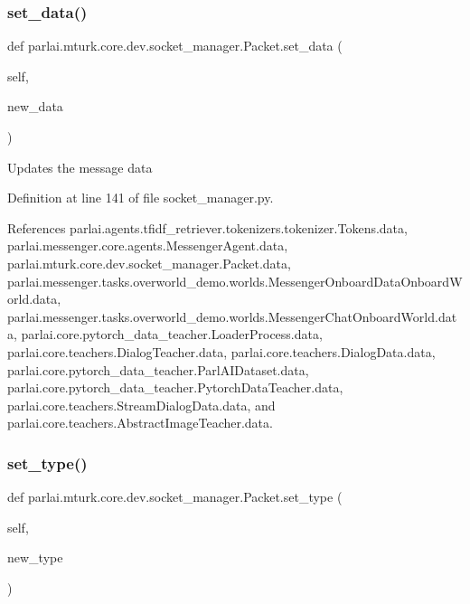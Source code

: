 \subsubsection{\texorpdfstring{set\+\_\+data()}{set\_data()}}
{\footnotesize\ttfamily def parlai.\+mturk.\+core.\+dev.\+socket\+\_\+manager.\+Packet.\+set\+\_\+data (\begin{DoxyParamCaption}\item[{}]{self,  }\item[{}]{new\+\_\+data }\end{DoxyParamCaption})}

\begin{DoxyVerb}Updates the message data\end{DoxyVerb}
 

Definition at line 141 of file socket\+\_\+manager.\+py.



References parlai.\+agents.\+tfidf\+\_\+retriever.\+tokenizers.\+tokenizer.\+Tokens.\+data, parlai.\+messenger.\+core.\+agents.\+Messenger\+Agent.\+data, parlai.\+mturk.\+core.\+dev.\+socket\+\_\+manager.\+Packet.\+data, parlai.\+messenger.\+tasks.\+overworld\+\_\+demo.\+worlds.\+Messenger\+Onboard\+Data\+Onboard\+World.\+data, parlai.\+messenger.\+tasks.\+overworld\+\_\+demo.\+worlds.\+Messenger\+Chat\+Onboard\+World.\+data, parlai.\+core.\+pytorch\+\_\+data\+\_\+teacher.\+Loader\+Process.\+data, parlai.\+core.\+teachers.\+Dialog\+Teacher.\+data, parlai.\+core.\+teachers.\+Dialog\+Data.\+data, parlai.\+core.\+pytorch\+\_\+data\+\_\+teacher.\+Parl\+A\+I\+Dataset.\+data, parlai.\+core.\+pytorch\+\_\+data\+\_\+teacher.\+Pytorch\+Data\+Teacher.\+data, parlai.\+core.\+teachers.\+Stream\+Dialog\+Data.\+data, and parlai.\+core.\+teachers.\+Abstract\+Image\+Teacher.\+data.

\mbox{\label{classparlai_1_1mturk_1_1core_1_1dev_1_1socket__manager_1_1Packet_afd43b3b84a5266bd3aaedc63a304e5a8}} 
\subsubsection{\texorpdfstring{set\+\_\+type()}{set\_type()}}
{\footnotesize\ttfamily def parlai.\+mturk.\+core.\+dev.\+socket\+\_\+manager.\+Packet.\+set\+\_\+type (\begin{DoxyParamCaption}\item[{}]{self,  }\item[{}]{new\+\_\+type }\end{DoxyParamCaption})}

